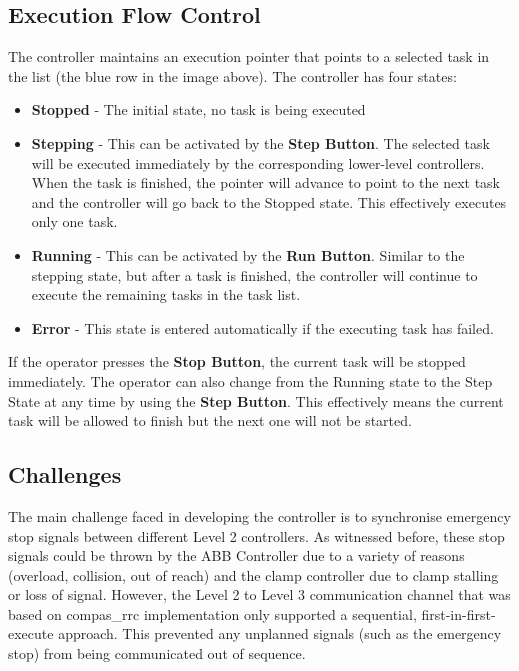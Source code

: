 \documentclass[11pt]{book}
\begin{document}
\subsection{Execution Flow Control}

The controller maintains an execution pointer that points to a selected task in the list (the blue row in the image above). The controller has four states:

\begin{itemize}
	\item \textbf{Stopped }- The initial state, no task is being executed

	\item \textbf{Stepping }- This can be activated by the \textbf{Step Button}. The selected task will be executed immediately by the corresponding lower-level controllers. When the task is finished, the pointer will advance to point to the next task and the controller will go back to the Stopped state. This effectively executes only one task.

	\item \textbf{Running }- This can be activated by the \textbf{Run Button}. Similar to the stepping state, but after a task is finished, the controller will continue to execute the remaining tasks in the task list.

	\item \textbf{Error }- This state is entered automatically if the executing task has failed.

\end{itemize}
If the operator presses the \textbf{Stop Button}, the current task will be stopped immediately. The operator can also change from the Running state to the Step State at any time by using the \textbf{Step Button}. This effectively means the current task will be allowed to finish but the next one will not be started. 

\subsection{Challenges}

The main challenge faced in developing the controller is to synchronise emergency stop signals between different Level 2 controllers. As witnessed before, these stop signals could be thrown by the ABB Controller due to a variety of reasons (overload, collision, out of reach) and the clamp controller due to clamp stalling or loss of signal. However, the Level 2 to Level 3 communication channel that was based on compas\_rrc implementation only supported a sequential, first-in-first-execute approach. This prevented any unplanned signals (such as the emergency stop) from being communicated out of sequence.
\end{document}
